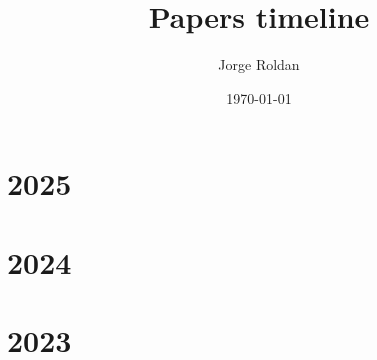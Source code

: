 \documentclass[10pt]{article}
\begin{document}
\title{\Large Papers timeline}
\author{Jorge Roldan}
\date{\today}

\maketitle

\tableofcontents

\newpage
\section{2025}
\begin{tcolorbox} [colback=blue!5!white,colframe=blue!75!black]
\begin{refsection}
    \nocite{deepseek-ai_deepseek-r1_2025}
    \printbibliography[heading=none]
\end{refsection}
\end{tcolorbox}

\newpage
\section{2024}
\begin{tcolorbox} [colback=blue!5!white,colframe=blue!75!black]
\begin{refsection}
    \nocite{qwen_qwen25_2025}
    \nocite{muennighoff_olmoe_2025}
    \nocite{penedo_fineweb_2024}
    \nocite{grattafiori2024llama3herdmodels}
    \nocite{gu_mamba_2024}
    \nocite{groeneveld_olmo_2024}
    \nocite{deepseek-ai_deepseek-v2_2024}
    \printbibliography[heading=none]
\end{refsection}
\end{tcolorbox}

\newpage
\section{2023}
\begin{tcolorbox} [colback=blue!5!white,colframe=blue!75!black]
\begin{refsection}
    \nocite{gu_mamba_2024}
    \nocite{jiang_mistral_2023}
    \nocite{touvron_llama_2023}
    \nocite{sun_principle-driven_2023}
    \nocite{anil_palm_2023}
    \nocite{peng_rwkv_2023}
    \nocite{rafailov_direct_2024}
    \nocite{yao_tree_2023}
    \nocite{noauthor_230401373_nodate}
    \nocite{liu_visual_2023}
    \nocite{longpre_flan_2023}
    \nocite{touvron2023llamaopenefficientfoundation}
    \nocite{huang_language_2023}
    \nocite{orvieto2023resurrectingrecurrentneuralnetworks}
    \nocite{noauthor_palm-e_nodate}
    \nocite{noauthor_gpt-4_2024}
    \nocite{longpre_flan_2023}
    \nocite{touvron2023llamaopenefficientfoundation}
    \printbibliography[heading=none]
\end{refsection}
\end{tcolorbox}
\end{document}
